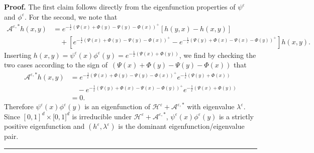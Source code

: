 \documentclass[10pt,a4paper]{amsart}
\newenvironment{proof}[1][Proof]{\noindent\textbf{#1.} }{\ \rule{0.5em}{0.5em}}
\begin{document}
\begin{proof}
The first claim follows directly from the eigenfunction properties of
$\psi^{\varepsilon}$ and $\phi^{\varepsilon}$. For the second, we note that
\begin{align*}
\mathcal{A}^{\varepsilon,\ast}h(x,y)  &  =e^{-\frac{1}{\varepsilon}\left(
\Psi(x)+\Phi(y)-\Psi(y)-\Phi(x)\right)  ^{+}}\left[  h(y,x)-h(x,y)\right] \\
&  \quad+\left[ e^{-\frac{1}{\varepsilon}\left(  \Psi(x)+\Phi
(y)-\Psi(y)-\Phi(x)\right)^{+}} -e^{-\frac{1}{\varepsilon}\left(  \Psi(y)+\Phi(x)-\Psi
(x)-\Phi(y)\right)  ^{+}}\right]  h(x,y).
\end{align*} 
Inserting $h(x,y)=\psi^{\varepsilon}(x)\phi^{\varepsilon}(y)=e^{-\frac
{1}{\varepsilon}\left(  \Psi(x)+\Phi(y)\right)  }$, we find by checking the
two cases according to the sign of~$\left(  \Psi(x)+\Phi(y)-\Psi
(y)-\Phi(x)\right)  $ that
\begin{align*}
\mathcal{A}^{\varepsilon,\ast}h(x,y)  &  =e^{-\frac{1}{\varepsilon}\left(
\Psi(x)+\Phi(y)-\Psi(y)-\Phi(x)\right)  ^{+}}e^{-\frac{1}{\varepsilon}\left(
\Psi(y)+\Phi(x)\right)  }\\
&  \quad-e^{-\frac{1}{\varepsilon}\left(  \Psi(y)+\Phi(x)-\Psi(x)-\Phi
(y)\right)  ^{+}}e^{-\frac{1}{\varepsilon}\left(  \Psi(x)+\Phi(y)\right)  }\\
&  =0.
\end{align*}
Therefore $\psi^{\varepsilon}(x)\phi^{\varepsilon}(y)$ is an eigenfunction of
$\mathcal{H}^{\varepsilon}+\mathcal{A}^{\varepsilon,\ast}$ with eigenvalue
$\lambda^{\varepsilon}$. Since $[0,1]^{d}\times\lbrack0,1]^{d}$ is irreducible
under $\mathcal{H}^{\varepsilon}+\mathcal{A}^{\varepsilon,\ast}$,
$\psi^{\varepsilon}(x)\phi^{\varepsilon}(y)$ is a strictly positive
eigenfunction and $(h^{\varepsilon},\lambda^{\varepsilon})$ is the dominant
eigenfunction/eigenvalue pair.
\end{proof}
\end{document}
